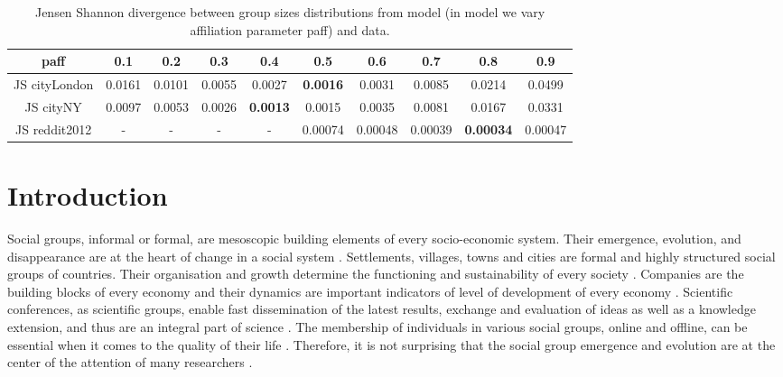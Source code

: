 \begin{table}[]
	\centering
	\begin{tabular}{c|c|c|c | c|c |c| c| c | c}
		
		paff & 0.1 & 0.2 & 0.3 & 0.4 & 0.5 & 0.6 & 0.7 & 0.8 & 0.9  \\
		\hline
		JS cityLondon & 0.0161 & 	0.0101  &	0.0055 &	0.0027  &	\textbf{0.0016} & 	0.0031 & 	0.0085  &	0.0214 & 	0.0499 \\
		JS cityNY & 0.0097 &	0.0053 & 	0.0026 &	\textbf{0.0013} & 	0.0015 & 	0.0035 & 	0.0081 & 	0.0167 &	0.0331 \\
		JS reddit2012 & - & - & - & - &  0.00074 & 0.00048 & 0.00039 & \textbf{0.00034} & 0.00047 \\
	\end{tabular}
	\caption{Jensen Shannon divergence between group sizes distributions from model (in model we vary affiliation parameter paff) and data. }
	\label{tab:my_label}
\end{table}


\section{Introduction}

Social groups, informal or formal, are mesoscopic building elements of every socio-economic system. Their emergence, evolution, and disappearance are at the heart of change in a social system \cite{}. Settlements, villages, towns and cities are formal and highly structured social groups of countries. Their organisation and growth determine the functioning and sustainability of every society \cite{barthelemy2016structure}. Companies are the building blocks of every economy and their dynamics are important indicators of level of development of every economy \cite{hidalgo2009building}. Scientific conferences, as scientific groups, enable fast dissemination of the latest results, exchange and evaluation of ideas as well as a knowledge extension, and thus are an integral part of science \cite{smiljanic2016theoretical}. The membership of individuals in various social groups, online and offline, can be essential when it comes to the quality of their life \cite{montazeri2001anxiety, davison2000talks, cho2012tea}. Therefore, it is not surprising that the social group emergence and evolution are at the center of the attention of many researchers \cite{aral2012identifying,gonzalez2013broadcasters, torok2013opinions, yasseri2012dynamics}.\\

